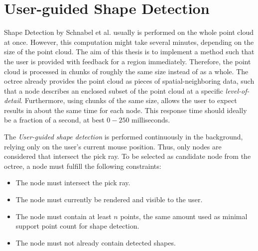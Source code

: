 \section{User-guided Shape Detection}
\label{sec:user_guided_sd}

Shape Detection by Schnabel et al. \cite{schnabel-2007-efficient} usually is performed on the whole point cloud at once. However, this computation might take several minutes, depending on the size of the point cloud. The aim of this thesis is to implement a method such that the user is provided with feedback for a region immediately. Therefore, the point cloud is processed in chunks of roughly the same size instead of as a whole. The octree already provides the point cloud as pieces of spatial-neighboring data, such that a node describes an enclosed subset of the point cloud at a specific \textit{level-of-detail}. Furthermore, using chunks of the same size, allows the user to expect results in about the same time for each node. This response time should ideally be a fraction of a second, at best $0-250$ milliseconds. 

The \textit{User-guided shape detection} is performed continuously in the background, relying only on the user's current mouse position. Thus, only nodes are considered that intersect the pick ray. To be selected as candidate node from the octree, a node must fulfill the following constraints: 
\begin{itemize}
    \item The node must intersect the pick ray.
    \item The node must currently be rendered and visible to the user. 
    \item The node must contain at least $n$ points, the same amount used as minimal support point count for shape detection.
    \item The node must not already contain detected shapes.
\end{itemize}

